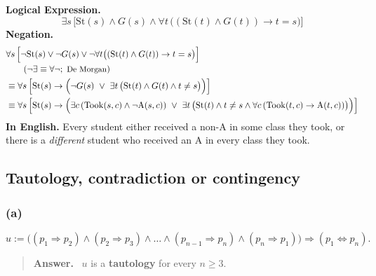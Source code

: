 \documentclass[11pt,a4paper]{article}
\renewcommand{\iff}{\Longleftrightarrow}
\newenvironment{answerbox}[1][Answer]{\par\smallskip\begin{quote}\textbf{#1.}\ }{\end{quote}}
\newenvironment{notebox}{\par\begin{quote}\textit{Remark.}\ }{\end{quote}}
\theoremstyle{definition}
\begin{document}
\textbf{Logical Expression.}
\[
\exists s\,\Big[\mathrm{St}(s)\wedge G(s)\wedge\forall t\,\big((\mathrm{St}(t)\wedge G(t))\to t=s\big)\Big]
\]
\textbf{Negation.}
\begin{align*}
&\forall s\,\Big[\neg\mathrm{St}(s)\vee\neg G(s)\vee\neg\forall t\big((\mathrm{St}(t)\wedge G(t))\to t=s\big)\Big]\\[-2pt]
&\qquad\small (\neg\exists\equiv\forall\neg;\ \text{De Morgan})\\
&\equiv\forall s\,\Big[\mathrm{St}(s)\to\Big(\neg G(s)\ \vee\ \exists t\,\big(\mathrm{St}(t)\wedge G(t)\wedge t\neq s\big)\Big)\Big]\\
&\equiv\forall s\,\Big[\mathrm{St}(s)\to\Big(\exists c\,(\mathrm{Took}(s,c)\wedge\neg\mathrm{A}(s,c))\ \vee\ \exists t\,\big(\mathrm{St}(t)\wedge t\neq s\wedge\forall c\,(\mathrm{Took}(t,c)\to\mathrm{A}(t,c))\big)\Big)\Big]
\end{align*}
\textbf{In English.} Every student either received a non-A in some class they took, or there is a \emph{different} student who received an A in every class they took. %












\subsection{Tautology, contradiction or contingency}

\subsubsection{(a)}
\[
u:=\big((p_1\Rightarrow p_2)\wedge(p_2\Rightarrow p_3)\wedge\dots\wedge(p_{n-1}\Rightarrow p_n)\wedge(p_n\Rightarrow p_1)\big)\Rightarrow(p_1\iff p_n).
\]
\begin{answerbox}[Answer]
$u$ is a \textbf{tautology} for every $n\ge3$.
\end{answerbox}
\end{document}
